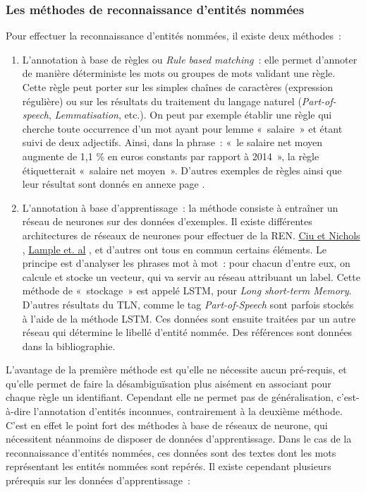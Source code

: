 \subsubsection*{Les méthodes de reconnaissance d'entités nommées}
Pour effectuer la reconnaissance d'entités nommées, il existe deux méthodes~: 
\begin{enumerate}
    \item L'annotation à base de règles ou \textit{Rule based matching}~: elle permet d'annoter de manière déterministe les mots ou groupes de mots validant une règle. Cette règle peut porter sur les simples chaînes de caractères (expression régulière) ou sur les résultats du traitement du langage naturel (\textit{Part-of-speech}, \textit{Lemmatisation}, etc.). On peut par exemple établir une règle qui cherche toute occurrence d'un mot ayant pour lemme «~salaire~» et étant suivi de deux adjectifs. Ainsi, dans la phrase~: «~le salaire net moyen augmente de 1,1 \% en euros constants par rapport à 2014~», la règle étiquetterait «~salaire net moyen~». D'autres exemples de règles ainsi que leur résultat sont donnés en annexe page \pageref{rule-exemple}.
    \vspace{5pt}
    \item L'annotation à base d'apprentissage~: la méthode consiste à entraîner un réseau de neurones sur des données d'exemples. Il existe différentes architectures de réseaux de neurones pour effectuer de la REN. \href{https://www.aclweb.org/anthology/Q16-1026}{Ciu et Nichols} \cite{chiu-nichols}, \href{https://www.aclweb.org/anthology/N16-1030}{Lample et. al} \cite{lampe-al}, et d'autres ont tous en commun certains éléments. Le principe est d'analyser les phrases mot à mot~: pour chacun d'entre eux, on calcule et stocke un vecteur, qui va servir au réseau attribuant un label. Cette méthode de «~stockage~» est appelé LSTM, pour \textit{Long short-term Memory}. D'autres résultats du TLN, comme le tag \textit{Part-of-Speech} sont parfois stockés à l'aide de la méthode LSTM. Ces données sont ensuite traitées par un autre réseau qui détermine le libellé d'entité nommée. Des références sont données dans la bibliographie.
    \newline
\end{enumerate}

L'avantage de la première méthode est qu'elle ne nécessite aucun pré-requis, et qu'elle permet de faire la désambiguïsation plus aisément en associant pour chaque règle un identifiant. Cependant elle ne permet pas de généralisation, c'est-à-dire l'annotation d'entités inconnues, contrairement à la deuxième méthode. C'est en effet le point fort des méthodes à base de réseaux de neurone, qui nécessitent néanmoins de disposer de données d'apprentissage. Dans le cas de la reconnaissance d'entités nommées, ces données sont des textes dont les mots représentant les entités nommées sont repérés. Il existe cependant plusieurs prérequis sur les données d'apprentissage~:
\newline

